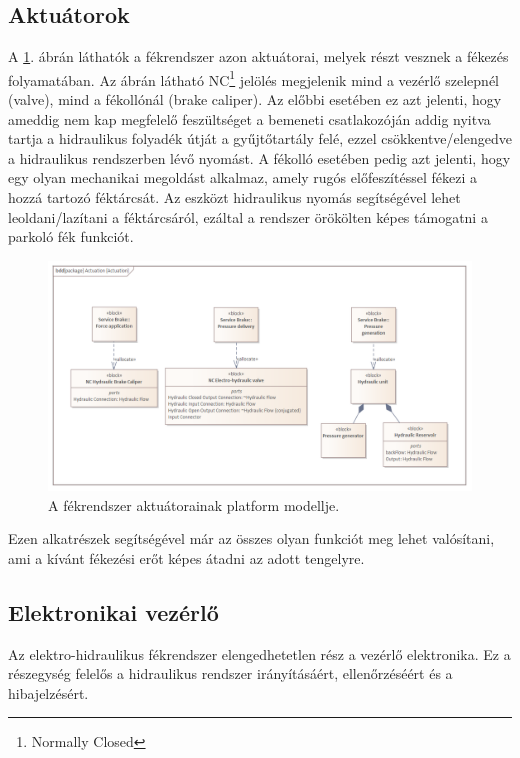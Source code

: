 \subsection{Aktuátorok}
A \ref{fig:act}. ábrán láthatók a fékrendszer azon aktuátorai, melyek részt vesznek a fékezés folyamatában.
Az ábrán látható NC\footnote{Normally Closed} jelölés megjelenik mind a vezérlő szelepnél (valve), mind a fékollónál (brake caliper).
Az előbbi esetében ez azt jelenti, hogy ameddig nem kap megfelelő feszültséget a bemeneti csatlakozóján addig nyitva tartja a hidraulikus folyadék útját a gyűjtőtartály felé, ezzel csökkentve/elengedve a hidraulikus rendszerben lévő nyomást.
A fékolló esetében pedig azt jelenti, hogy egy olyan mechanikai megoldást alkalmaz, amely rugós előfeszítéssel fékezi a hozzá tartozó féktárcsát.
Az eszközt hidraulikus nyomás segítségével lehet leoldani/lazítani a féktárcsáról, ezáltal a rendszer örökölten képes támogatni a parkoló fék funkciót.

\begin{figure}
    \centering
    \footnotesize
    \includegraphics[width=150mm, keepaspectratio]{figures/Platform_Actuation_bdd.png}
    \caption{A fékrendszer aktuátorainak platform modellje.}
    \label{fig:act}
\end{figure}

Ezen alkatrészek segítségével már az összes olyan funkciót meg lehet valósítani, ami a kívánt fékezési erőt képes átadni az adott tengelyre.


\subsection{Elektronikai vezérlő}
Az elektro-hidraulikus fékrendszer elengedhetetlen rész a vezérlő elektronika.
Ez a részegység felelős a hidraulikus rendszer irányításáért, ellenőrzéséért és a hibajelzésért.

